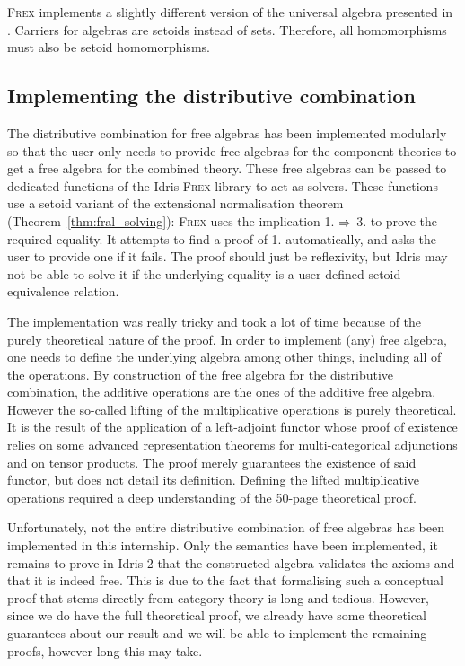 \textsc{Frex} implements a slightly different version of the universal algebra presented in . Carriers for algebras are setoids instead of sets. Therefore, all homomorphisms must also be setoid homomorphisms.

\subsection{Implementing the distributive combination}
\label{sec:distr_comb_implem}

The distributive combination for free algebras has been implemented modularly so that the user only needs to provide free algebras for the component theories to get a free algebra for the combined theory. These free algebras can be passed to dedicated functions of the Idris \textsc{Frex} library to act as solvers. These functions use a setoid variant of the extensional normalisation theorem (Theorem~\ref{thm:fral_solving}): \textsc{Frex} uses the implication 1. $\Rightarrow$ 3. to prove the required equality. It attempts to find a proof of 1. automatically, and asks the user to provide one if it fails. The proof should just be reflexivity, but Idris may not be able to solve it if the underlying equality is a user-defined setoid equivalence relation.

The implementation was really tricky and took a lot of time because of the purely theoretical nature of the proof. In order to implement (any) free algebra, one needs to define the underlying algebra among other things, including all of the operations. By construction of the free algebra for the distributive combination, the additive operations are the ones of the additive free algebra. However the so-called lifting of the multiplicative operations is purely theoretical. It is the result of the application of a left-adjoint functor whose proof of existence relies on some advanced representation theorems for multi-categorical adjunctions and on tensor products. The proof merely guarantees the existence of said functor, but does not detail its definition. Defining the lifted multiplicative operations required a deep understanding of the 50-page theoretical proof.

Unfortunately, not the entire distributive combination of free algebras has been implemented in this internship. Only the semantics have been implemented, it remains to prove in Idris 2 that the constructed algebra validates the axioms and that it is indeed free. This is due to the fact that formalising such a conceptual proof that stems directly from category theory is long and tedious. However, since we do have the full theoretical proof, we already have some theoretical guarantees about our result and we will be able to implement the remaining proofs, however long this may take.

